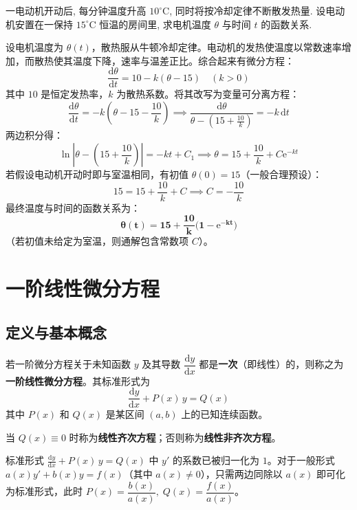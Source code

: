 \documentclass[lang=cn,11pt]{elegantbook}
\begin{document}
\begin{exercise}[实际应用题]
一电动机开动后, 每分钟温度升高 $10^\circ\mathrm{C}$, 同时将按冷却定律不断散发热量. 设电动机安置在一保持 $15^\circ\mathrm{C}$ 恒温的房间里, 求电机温度 $\theta$ 与时间 $t$ 的函数关系.
\end{exercise}
\begin{solution}
设电机温度为 $\theta(t)$，散热服从牛顿冷却定律。电动机的发热使温度以常数速率增加，而散热使其温度下降，速率与温差正比。综合起来有微分方程：
\[
\frac{\mathrm{d}\theta}{\mathrm{d}t} = 10 - k(\theta - 15) \quad (k>0)
\]
其中 $10$ 是恒定发热率，$k$ 为散热系数。将其改写为变量可分离方程：
\[
\frac{\mathrm{d}\theta}{\mathrm{d}t} = -k\left(\theta - 15 - \frac{10}{k}\right) \implies \frac{\mathrm{d}\theta}{\theta - \left(15 + \frac{10}{k}\right)} = -k\,\mathrm{d}t
\]
两边积分得：
\[
\ln\left|\theta - \left(15 + \frac{10}{k}\right)\right| = -kt + C_1 \implies \theta = 15 + \frac{10}{k} + C\mathrm{e}^{-kt}
\]
若假设电动机开动时即与室温相同，有初值 $\theta(0) = 15$（一般合理预设）：
\[
15 = 15 + \frac{10}{k} + C \implies C = -\frac{10}{k}
\]
最终温度与时间的函数关系为：
\[
\mathbf{\theta(t) = 15 + \frac{10}{k}\big(1 - \mathrm{e}^{-kt}\big)}
\]
（若初值未给定为室温，则通解包含常数项 $C$）。
\end{solution}


\section{一阶线性微分方程}

\subsection{定义与基本概念}
\begin{definition}[一阶线性微分方程] \label{def:first-order-linear}
若一阶微分方程关于未知函数 $y$ 及其导数 $\dfrac{\mathrm{d}y}{\mathrm{d}x}$ 都是\textbf{一次}（即线性）的，则称之为\textbf{一阶线性微分方程}。其标准形式为
\[
\frac{\mathrm{d}y}{\mathrm{d}x}+P(x)\,y=Q(x)
\]
其中 $P(x)$ 和 $Q(x)$ 是某区间 $(a,b)$ 上的已知连续函数。

当 $Q(x)\equiv 0$ 时称为\textbf{线性齐次方程}；否则称为\textbf{线性非齐次方程}。
\end{definition}

\begin{note}
标准形式 $\frac{\mathrm{d}y}{\mathrm{d}x}+P(x)\,y=Q(x)$ 中 $y'$ 的系数已被归一化为 $1$。对于一般形式 $a(x)y'+b(x)y=f(x)$（其中 $a(x) \neq 0$），只需两边同除以 $a(x)$ 即可化为标准形式，此时
$P(x)=\dfrac{b(x)}{a(x)},\; Q(x)=\dfrac{f(x)}{a(x)}$。
\end{note}
\end{document}

